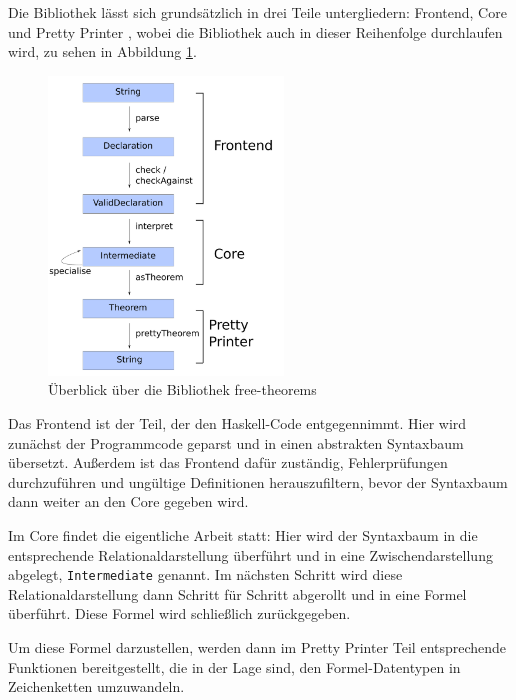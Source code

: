 Die Bibliothek lässt sich grundsätzlich in drei Teile untergliedern: Frontend, Core und Pretty Printer \cite{freetheorems}, wobei
die Bibliothek auch in dieser Reihenfolge durchlaufen wird, zu sehen in Abbildung \ref{fig:overview}.

\begin{figure}[ht]
\centering
\includegraphics[height=300px]{overview-free-theorems}
\caption{Überblick über die Bibliothek free-theorems}
\label{fig:overview}
\end{figure}

Das Frontend ist der Teil, der den Haskell-Code entgegennimmt. Hier wird zunächst der Programmcode geparst und in einen
abstrakten Syntaxbaum übersetzt. Außerdem ist das Frontend dafür zuständig, Fehlerprüfungen durchzuführen und
ungültige Definitionen herauszufiltern, bevor der Syntaxbaum dann weiter an den Core gegeben wird.


Im Core findet die eigentliche Arbeit statt: Hier wird der Syntaxbaum in die entsprechende Relationaldarstellung
überführt und in eine Zwischendarstellung abgelegt, \texttt{Intermediate} genannt. Im nächsten Schritt wird diese
Relationaldarstellung dann Schritt für Schritt abgerollt und in eine Formel überführt. Diese Formel wird schließlich zurückgegeben.

Um diese Formel darzustellen, werden dann im Pretty Printer Teil entsprechende Funktionen bereitgestellt, die in der Lage
sind, den Formel-Datentypen in Zeichenketten umzuwandeln.

